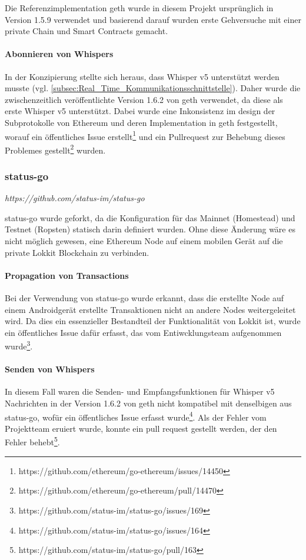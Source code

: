 Die Referenzimplementation geth wurde in diesem Projekt ursprünglich in Version 1.5.9 verwendet und basierend darauf wurden erste Gehversuche mit einer private Chain und Smart Contracts gemacht. 

\paragraph{Abonnieren von Whispers}
In der Konzipierung stellte sich heraus, dass Whisper v5 unterstützt werden musste (vgl. \ref{subsec:Real_Time_Kommunikationsschnittstelle}). Daher wurde die zwischenzeitlich veröffentlichte Version 1.6.2 von geth verwendet, da diese als erste Whisper v5 unterstützt. Dabei wurde eine Inkonsistenz im design der Subprotokolle von Ethereum und deren Implementation in geth festgestellt, worauf ein öffentliches Issue erstellt\footnote{https://github.com/ethereum/go-ethereum/issues/14450} und ein Pullrequest zur Behebung dieses Problemes gestellt\footnote{https://github.com/ethereum/go-ethereum/pull/14470} wurden.

\subsubsection{status-go}
\emph{https://github.com/status-im/status-go}
 
status-go wurde geforkt, da die Konfiguration für das Mainnet (Homestead) und Testnet (Ropsten) statisch darin definiert wurden. Ohne diese Änderung wäre es nicht möglich gewesen, eine Ethereum Node auf einem mobilen Gerät auf die private Lokkit Blockchain zu verbinden.

\paragraph{Propagation von Transactions}
Bei der Verwendung von status-go wurde erkannt, dass die erstellte Node auf einem Androidgerät erstellte Transaktionen nicht an andere Nodes weitergeleitet wird. Da dies ein essenzieller Bestandteil der Funktionalität von Lokkit ist, wurde ein öffentliches Issue dafür erfasst, das vom Entiwcklungsteam aufgenommen wurde\footnote{https://github.com/status-im/status-go/issues/169}.

\paragraph{Senden von Whispers}
In diesem Fall waren die Senden- und Empfangsfunktionen für Whisper v5 Nachrichten in der Version 1.6.2 von geth nicht kompatibel mit denselbigen aus status-go, wofür ein öffentliches Issue erfasst wurde\footnote{https://github.com/status-im/status-go/issues/164}. Als der Fehler vom Projektteam eruiert wurde, konnte ein pull request gestellt werden, der den Fehler behebt\footnote{https://github.com/status-im/status-go/pull/163}.
